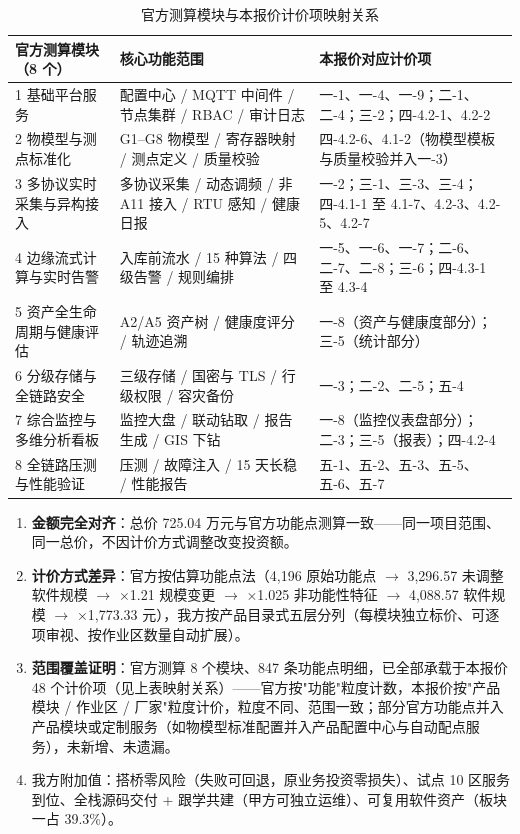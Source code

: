 \documentclass[11pt,a4paper]{ctexart}
\begin{document}
\begin{table}[H]\centering
\caption{官方测算模块与本报价计价项映射关系}
\begin{tabular}{p{3.6cm} p{4.4cm} p{5.6cm}}
\toprule
\textbf{官方测算模块（8 个）} & \textbf{核心功能范围} & \textbf{本报价对应计价项} \\
\midrule
1 基础平台服务 & 配置中心 / MQTT 中间件 / 节点集群 / RBAC / 审计日志 & 一-1、一-4、一-9；二-1、二-4；三-2；四-4.2-1、4.2-2 \\
2 物模型与测点标准化 & G1--G8 物模型 / 寄存器映射 / 测点定义 / 质量校验 & 四-4.2-6、4.1-2（物模型模板与质量校验并入一-3） \\
3 多协议实时采集与异构接入 & 多协议采集 / 动态调频 / 非 A11 接入 / RTU 感知 / 健康日报 & 一-2；三-1、三-3、三-4；四-4.1-1 至 4.1-7、4.2-3、4.2-5、4.2-7 \\
4 边缘流式计算与实时告警 & 入库前流水 / 15 种算法 / 四级告警 / 规则编排 & 一-5、一-6、一-7；二-6、二-7、二-8；三-6；四-4.3-1 至 4.3-4 \\
5 资产全生命周期与健康评估 & A2/A5 资产树 / 健康度评分 / 轨迹追溯 & 一-8（资产与健康度部分）；三-5（统计部分） \\
6 分级存储与全链路安全 & 三级存储 / 国密与 TLS / 行级权限 / 容灾备份 & 一-3；二-2、二-5；五-4 \\
7 综合监控与多维分析看板 & 监控大盘 / 联动钻取 / 报告生成 / GIS 下钻 & 一-8（监控仪表盘部分）；二-3；三-5（报表）；四-4.2-4 \\
8 全链路压测与性能验证 & 压测 / 故障注入 / 15 天长稳 / 性能报告 & 五-1、五-2、五-3、五-5、五-6、五-7 \\
\bottomrule
\end{tabular}
\end{table}

\begin{enumerate}[leftmargin=*]
  \item \textbf{金额完全对齐}：总价 725.04 万元与官方功能点测算一致——同一项目范围、同一总价，不因计价方式调整改变投资额。
  \item \textbf{计价方式差异}：官方按估算功能点法（4,196 原始功能点 $\rightarrow$ 3,296.57 未调整软件规模 $\rightarrow$ $\times$1.21 规模变更 $\rightarrow$ $\times$1.025 非功能性特征 $\rightarrow$ 4,088.57 软件规模 $\rightarrow$ $\times$1,773.33 元），我方按产品目录式五层分列（每模块独立标价、可逐项审视、按作业区数量自动扩展）。
  \item \textbf{范围覆盖证明}：官方测算 8 个模块、847 条功能点明细，已全部承载于本报价 48 个计价项（见上表映射关系）——官方按"功能"粒度计数，本报价按"产品模块 / 作业区 / 厂家"粒度计价，粒度不同、范围一致；部分官方功能点并入产品模块或定制服务（如物模型标准配置并入产品配置中心与自动配点服务），未新增、未遗漏。
  \item 我方附加值：搭桥零风险（失败可回退，原业务投资零损失）、试点 10 区服务到位、全栈源码交付 + 跟学共建（甲方可独立运维）、可复用软件资产（板块一占 39.3\%）。
\end{enumerate}
\end{document}
